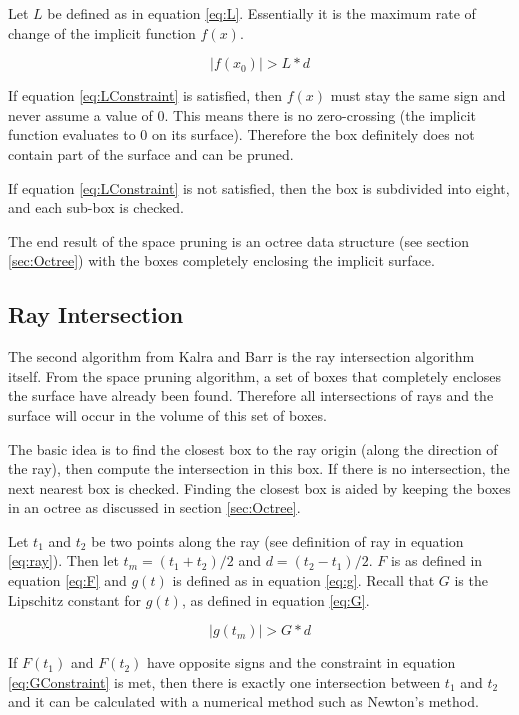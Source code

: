\documentclass[conference]{acmsiggraph}
\begin{document}
Let $L$ be defined as in equation \ref{eq:L}.  Essentially it is
the maximum rate of change of the implicit function $f(x)$.  

\begin{equation}
\label{eq:LConstraint}
|f(x_0)| > L * d
\end{equation}

If equation \ref{eq:LConstraint} is satisfied, then $f(x)$ must stay 
the same sign and never assume a value of 0.  
This means there is no zero-crossing (the implicit function
evaluates to 0 on its surface).  Therefore the box definitely does not
contain part of the surface and can be pruned.  

If equation \ref{eq:LConstraint} is not satisfied, then the box is 
subdivided into eight, and each sub-box is checked.

The end result of the space pruning is an octree data structure 
(see section \ref{sec:Octree}) with the boxes completely enclosing the
implicit surface.

\subsection{Ray Intersection}
\label{sec:RayIntersection}

The second algorithm from Kalra and Barr is the ray intersection algorithm 
itself.  From the space pruning algorithm, a set of boxes that completely 
encloses the surface have already been found.  Therefore all intersections
of rays and the surface will occur in the volume of this set of boxes.

The basic idea is to find the closest box to the ray origin (along the 
direction of the ray), then compute the intersection in this box.  If 
there is no intersection, the next nearest box is checked.  Finding 
the closest box is aided by keeping the boxes in an octree as
discussed in section \ref{sec:Octree}.

Let $t_1$ and $t_2$ be two points along the ray (see definition of ray
in equation \ref{eq:ray}).  Then let $t_m = (t_1 + t_2) / 2$ and 
$d = (t_2 - t_1) / 2$.  
$F$ is as defined in equation \ref{eq:F} and $g(t)$ is defined as in 
equation \ref{eq:g}.  Recall that $G$ is the Lipschitz constant for $g(t)$,
as defined in equation \ref{eq:G}.

\begin{equation}
\label{eq:GConstraint}
|g(t_m)| > G * d
\end{equation}

If $F(t_1)$ and $F(t_2)$ have opposite signs and the constraint in 
equation \ref{eq:GConstraint} is met, then there is exactly one 
intersection between $t_1$ and $t_2$ and it can be calculated with
a numerical method such as Newton's method.
\end{document}
